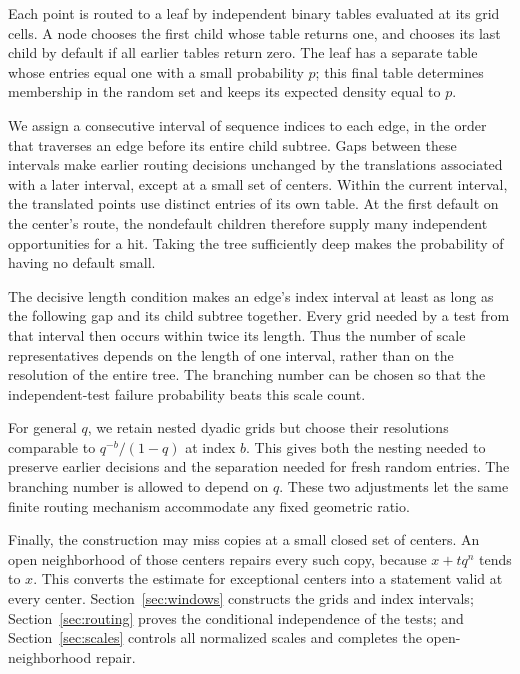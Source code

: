 Each point is routed to a leaf by independent binary tables evaluated
at its grid cells. A node chooses the first child whose table returns
one, and chooses its last child by default if all earlier tables return
zero. The leaf has a separate table whose entries equal one with a
small probability $p$; this final table determines membership in the
random set and keeps its expected density equal to $p$.

We assign a consecutive interval of sequence indices to each edge,
in the order that traverses an edge before its entire child subtree.
Gaps between these intervals make earlier routing decisions unchanged
by the translations associated with a later interval, except at a
small set of centers. Within the current interval, the translated
points use distinct entries of its own table. At the first default
on the center's route, the nondefault children therefore supply
many independent opportunities for a hit. Taking the tree sufficiently
deep makes the probability of having no default small.

The decisive length condition makes an edge's index interval at least
as long as the following gap and its child subtree together. Every
grid needed by a test from that interval then occurs within twice its
length. Thus the number of scale representatives depends on the
length of one interval, rather than on the resolution of the entire
tree. The branching number can be chosen so that the independent-test
failure probability beats this scale count.

For general $q$, we retain nested dyadic grids but choose their
resolutions comparable to $q^{-b}/(1-q)$ at index $b$. This gives
both the nesting needed to preserve earlier decisions and the
separation needed for fresh random entries. The branching number is
allowed to depend on $q$. These two adjustments let the same finite
routing mechanism accommodate any fixed geometric ratio.

Finally, the construction may miss copies at a small closed set of
centers. An open neighborhood of those centers repairs every such
copy, because $x+tq^n$ tends to $x$. This converts the estimate for
exceptional centers into a statement valid at every center.
Section~\ref{sec:windows} constructs the grids and index intervals;
Section~\ref{sec:routing} proves the conditional independence of the
tests; and Section~\ref{sec:scales} controls all normalized scales
and completes the open-neighborhood repair.
